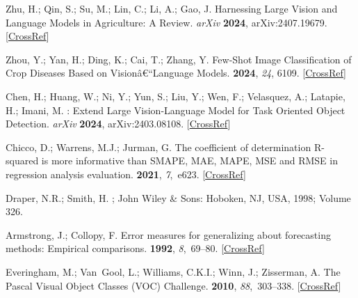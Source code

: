 \documentclass[12pt,a4paper,oneside]{report}
\begin{document}
\begin{thebibliography}{999}
Zhu, H.; Qin, S.; Su, M.; Lin, C.; Li, A.; Gao, J.
\newblock Harnessing {Large} {Vision} and {Language} {Models} in {Agriculture}:
{A} {Review}. {\em arXiv} {\bf2024}, arXiv:2407.19679. 
[\href{https://doi.org/10.48550/arXiv.2407.19679}{CrossRef}]

Zhou, Y.; Yan, H.; Ding, K.; Cai, T.; Zhang, Y.
\newblock Few-Shot Image Classification of Crop Diseases Based on
Visionâ€“Language Models.
 {\bf 2024}, {\em 24}, 6109. [\href{http://dx.doi.org/10.3390/s24186109}{CrossRef}]

Chen, H.; Huang, W.; Ni, Y.; Yun, S.; Liu, Y.; Wen, F.; Velasquez, A.; Latapie,
H.; Imani, M.
: {Extend} {Large} {Vision}-{Language} {Model} for {Task}
{Oriented} {Object} {Detection}. {\em arXiv} {\bf2024}, arXiv:2403.08108. 
[\href{https://doi.org/10.48550/arXiv.2403.08108}{CrossRef}]

Chicco, D.; Warrens, M.J.; Jurman, G.
\newblock The coefficient of determination {R}-squared is more informative than
{SMAPE}, {MAE}, {MAPE}, {MSE} and {RMSE} in regression analysis evaluation.
 {\bf 2021}, {\em 7},~e623. [\href{http://dx.doi.org/10.7717/peerj-cs.623}{CrossRef}]

Draper, N.R.; Smith, H.
; John Wiley \& Sons: Hoboken, NJ, USA, 1998; Volume 326. 

Armstrong, J.; Collopy, F.
\newblock Error measures for generalizing about forecasting methods: Empirical
comparisons.
 {\bf 1992}, {\em
8},~69--80. [\href{http://dx.doi.org/10.1016/0169-2070(92)90008-W}{CrossRef}]

Everingham, M.; Van~Gool, L.; Williams, C.K.I.; Winn, J.; Zisserman, A.
\newblock The {Pascal} {Visual} {Object} {Classes} ({VOC}) {Challenge}.
 {\bf 2010}, {\em
88},~303--338. [\href{http://dx.doi.org/10.1007/s11263-009-0275-4}{CrossRef}]


\end{thebibliography}
\end{document}
